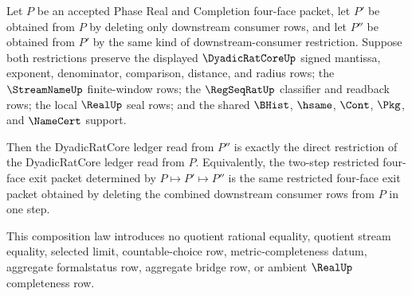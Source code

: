 \begin{theorem}
\label{thm:dyadicratcore-l10-exit-ledger-restriction-composition}
Let $P$ be an accepted Phase Real and Completion four-face packet, let $P'$ be obtained from $P$ by deleting only downstream consumer rows, and let $P''$ be obtained from $P'$ by the same kind of downstream-consumer restriction. Suppose both restrictions preserve the displayed $\DyadicRatCoreUp$ signed mantissa, exponent, denominator, comparison, distance, and radius rows; the $\StreamNameUp$ finite-window rows; the $\RegSeqRatUp$ classifier and readback rows; the local $\RealUp$ seal rows; and the shared $\BHist$, $\hsame$, $\Cont$, $\Pkg$, and $\NameCert$ support.

Then the DyadicRatCore ledger read from $P''$ is exactly the direct restriction of the DyadicRatCore ledger read from $P$. Equivalently, the two-step restricted four-face exit packet determined by $P \mapsto P' \mapsto P''$ is the same restricted four-face exit packet obtained by deleting the combined downstream consumer rows from $P$ in one step.

This composition law introduces no quotient rational equality, quotient stream equality, selected limit, countable-choice row, metric-completeness datum, aggregate formalstatus row, aggregate bridge row, or ambient $\RealUp$ completeness row.
\end{theorem}
